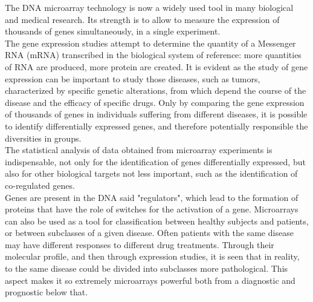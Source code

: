 \documentclass[a4paper]{report}
\begin{document}
The DNA microarray technology is now a widely used tool 
in many biological and medical research. Its strength is to allow to measure the expression of thousands of genes simultaneously, in a single experiment.\\
The gene expression studies attempt to determine the quantity of a Messenger RNA (mRNA) transcribed in the biological system of reference: more quantities of RNA are produced, more protein are created. It is evident as the study of gene expression can be important to study those diseases, such as tumors, characterized by specific genetic alterations, from which depend the course of the disease and the efficacy of specific drugs. Only by comparing the gene expression of thousands of genes in individuals suffering from different diseases, it is possible to identify differentially expressed genes, and therefore potentially responsible the diversities in groups.\\
The statistical analysis of data obtained from microarray experiments is indispensable, not only for the identification of genes differentially expressed, but also for other biological targets not less important, such as the identification of co-regulated genes.\\
Genes are present in the DNA said "regulators", which lead to the formation of proteins that have the role of switches for the activation of a gene. Microarrays can also be used as a tool for classification between healthy subjects and patients, or between subclasses of a given disease. Often patients with the same disease may have different responses to different drug treatments. Through their molecular profile, and then through expression studies, it is seen that in reality, to the same disease could be divided into subclasses more pathological. This aspect makes it so extremely microarrays powerful both from a diagnostic and prognostic below that.\\
\end{document}
